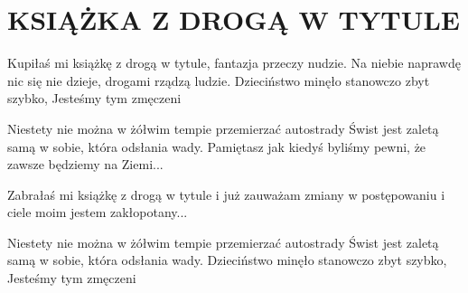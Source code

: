 \documentclass[../../../songbook.tex]{subfiles}
\begin{document}
\TabPositions{8cm} %
\section*{KSIĄŻKA Z DROGĄ W TYTULE}
{}
\vspace{0.5cm}
Kupiłaś mi książkę z drogą w tytule,	 \newline			
fantazja przeczy nudzie.				 \newline			
Na niebie naprawdę nic się nie dzieje,	 \newline	
drogami rządzą ludzie.					 \newline		
Dzieciństwo minęło stanowczo zbyt szybko, \newline		 
Jesteśmy tym zmęczeni					 \newline	

Niestety nie można w żółwim tempie		 \newline
przemierzać autostrady					 \newline
Świst jest zaletą samą w sobie,				 \newline
która odsłania wady.				 \newline
Pamiętasz jak kiedyś byliśmy pewni,				 \newline
że zawsze będziemy na Ziemi...				 \newline

\-\hspace{1cm} Zabrałaś mi książkę z drogą w tytule	 \newline		
\-\hspace{1cm} i już zauważam zmiany					 \newline
\-\hspace{1cm} w postępowaniu i ciele moim				 \newline	
\-\hspace{1cm} jestem zakłopotany...					 \newline		

Niestety nie można w żółwim tempie				 \newline
przemierzać autostrady				 \newline
Świst jest zaletą samą w sobie,				 \newline
która odsłania wady.				 \newline
Dzieciństwo minęło stanowczo zbyt szybko,					 \newline	
Jesteśmy tym zmęczeni				 \newline
\end{document}
